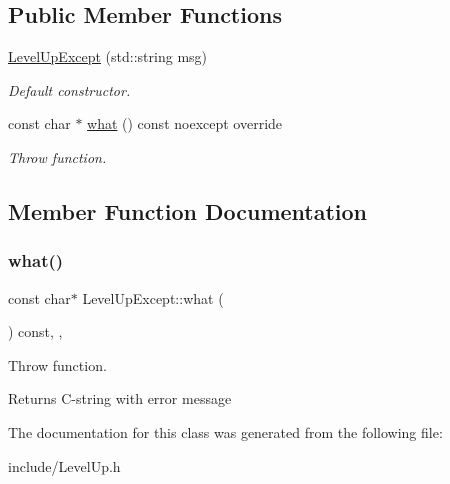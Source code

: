 \subsection*{Public Member Functions}
\begin{DoxyCompactItemize}
\item 
\mbox{\label{classLevelUpExcept_ae885d6dd4fc84fd43f0c834d342a0995}} 
\hyperlink{classLevelUpExcept_ae885d6dd4fc84fd43f0c834d342a0995}{Level\+Up\+Except} (std\+::string msg)
\begin{DoxyCompactList}\small\item\em Default constructor. \end{DoxyCompactList}\item 
const char $\ast$ \hyperlink{classLevelUpExcept_a4a4cacd5c4f9ee0a691a57dd231d7c46}{what} () const noexcept override
\begin{DoxyCompactList}\small\item\em Throw function. \end{DoxyCompactList}\end{DoxyCompactItemize}


\subsection{Member Function Documentation}
\mbox{\label{classLevelUpExcept_a4a4cacd5c4f9ee0a691a57dd231d7c46}} 
\subsubsection{\texorpdfstring{what()}{what()}}
{\footnotesize\ttfamily const char$\ast$ Level\+Up\+Except\+::what (\begin{DoxyParamCaption}{ }\end{DoxyParamCaption}) const\hspace{0.3cm}{\ttfamily [inline]}, {\ttfamily [override]}, {\ttfamily [noexcept]}}



Throw function. 

\begin{DoxyReturn}{Returns}
C-\/string with error message 
\end{DoxyReturn}


The documentation for this class was generated from the following file\+:\begin{DoxyCompactItemize}
\item 
include/Level\+Up.\+h\end{DoxyCompactItemize}
